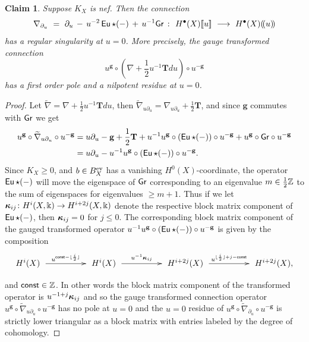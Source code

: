 \documentclass[twoside,leqno]{article}
\numberwithin{equation}{section}
\theoremstyle{plain}
\newtheorem{claim}[equation]{Claim}
\theoremstyle{definition}
\begin{document}
\begin{claim} \label{claim:nefK}
Suppose $K_{X}$ is nef. Then the
connection 
\[
\nabla_{\partial_{u}} \ = \ \partial_{u} \, - \, u^{-2}\Eu\qup (-) \, + \, 
u^{-1}\Gr \ \colon \ H^{\bullet}(X)\dbb{u} \ \longrightarrow \ 
H^{\bullet}(X)\dbp{u}
\]
has a regular singularity at $u=0$. More precisely, the gauge transformed connection 
\[
u^{\mathbf{g}}\circ \left(\nabla + \frac{1}{2}u^{-1}\mathbf{T}du\right)\circ u^{-\mathbf{g}}
\]
has a first order pole and a nilpotent residue at $u=0$.
\end{claim}
\begin{proof} 
Let $\widetilde{\nabla} = \nabla + \frac{1}{2}u^{-1}\mathbf{T}du$, then $\widetilde{\nabla}_{u\partial_{u}} = \nabla_{u\partial_{u}} + \frac{1}{2}\mathbf{T}$, and since $\mathbf{g}$ commutes with $\mathsf{Gr}$ we get 
\[
\begin{aligned}
u^{\mathbf{g}}\circ \widetilde{\nabla}_{u\partial_{u}}\circ u^{-\mathbf{g}} & = u\partial_{u} - \mathbf{g} + \frac{1}{2}\mathbf{T} + u^{-1} u^{\mathbf{g}}\circ (\operatorname{\mathsf{Eu}}\star (-))\circ u^{-\mathbf{g}} + u^{\mathbf{g}}\circ \mathsf{Gr} \circ u^{-\mathbf{g}}  \\
& = u\partial_{u} - u^{-1} u^{\mathbf{g}}\circ (\operatorname{\mathsf{Eu}}\star (-))\circ u^{-\mathbf{g}}.
\end{aligned}
\]
Since $K_{X} \geq 0$, and $b \in B_{X}^{\mathrm{ev}}$ has a vanishing $H^0(X)$-coordinate, the operator $\operatorname{\mathsf{Eu}}\star(-)$ will move the eigenspace of $\mathsf{Gr}$ corresponding to an eigenvalue $m \in \frac{1}{2}\mathbb Z$ to the sum of eigenspaces for eigenvalues $\geq m + 1$.  
Thus if we let $\boldsymbol{\kappa}_{ij} \colon H^{i}(X,\Bbbk) \to H^{i + 2j}(X,\Bbbk)$ denote the respective block matrix component of $\operatorname{\mathsf{Eu}}\star (-)$, then $\boldsymbol{\kappa}_{ij} = 0$ for $j\leq 0$. The corresponding block matrix component of the gauged transformed operator $u^{-1} u^{\mathbf{g}}\circ (\operatorname{\mathsf{Eu}}\star (-))\circ u^{-\mathbf{g}}$ is given by the composition
\[
\xymatrix@1@C+2pc@M+0.5pc{H^{i}(X) \ar[r]^-{u^{\mathsf{const}-\floor{\frac{i}{2}}}} & H^{i}(X) \ar[r]^-{u^{-1}\bkappa_{ij}} & 
H^{i+2j}(X) \ar[r]^-{u^{\floor{\frac{i}{2}}+j-\mathsf{const}}} & H^{i+2j}(X),
}
\]
and $\mathsf{const} \in \mathbb Z$. 
In other words the block matrix component  of the transformed operator is $u^{-1+j}\boldsymbol{\kappa}_{ij}$ and so the gauge  transformed connection operator  
$u^{\mathbf{g}}\circ \widetilde{\nabla}_{u\partial_{u}}\circ u^{-\mathbf{g}}$ has no pole at $u=0$ and the $u = 0$ residue of  $u^{\mathbf{g}}\circ \widetilde{\nabla}_{\partial_{u}}\circ u^{-\mathbf{g}}$ is strictly lower triangular as a block matrix with entries labeled by the degree of cohomology.
\end{proof}
\end{document}
